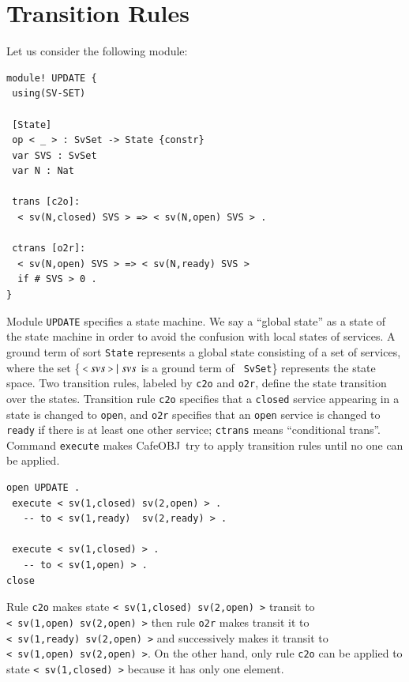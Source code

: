 \documentclass[12pt]{report}
\newcommand{\mbstt}[1]{\mbox{\small{\tt {#1}}}}
\newcommand{\stt}[1]{{\small{\tt {#1}}}}
\newcommand{\cafeobj}{{\sf CafeOBJ}~}
\begin{document}
\section{Transition Rules}
\label{sec:rules}
Let us consider the following module:
\begin{verbatim}
module! UPDATE {
 using(SV-SET)

 [State]
 op < _ > : SvSet -> State {constr}
 var SVS : SvSet    
 var N : Nat

 trans [c2o]: 
  < sv(N,closed) SVS > => < sv(N,open) SVS > .

 ctrans [o2r]: 
  < sv(N,open) SVS > => < sv(N,ready) SVS >
  if # SVS > 0 . 
}
\end{verbatim}
Module {\tt UPDATE} specifies a state machine. We say a ``global state''
as a state of the state machine in order to avoid the confusion with
local states of services. A ground term of sort {\tt State} represents
a global state consisting of a set of services, where the set
\{$\ \mbstt{<}\ svs\ \mbstt{>}\mid svs$ is a ground term of {\tt
  SvSet}\} represents the state space. Two transition rules, labeled
by {\tt c2o} and {\tt o2r}, define the state transition over the
states.  Transition rule {\tt c2o} specifies that a {\tt closed}
service appearing in a state is changed to {\tt open}, and {\tt o2r}
specifies that an {\tt open} service is changed to {\tt ready} if
there is at least one other service; {\tt ctrans} means ``conditional
trans''.  Command {\tt execute} makes \cafeobj try to apply transition
rules until no one can be applied.
\begin{verbatim}
open UPDATE .
 execute < sv(1,closed) sv(2,open) > .
   -- to < sv(1,ready)  sv(2,ready) > .

 execute < sv(1,closed) > .
   -- to < sv(1,open) > .
close
\end{verbatim}
Rule {\tt c2o} makes state \stt{<~sv(1,closed)~sv(2,open)~>} transit
to \stt{<~sv(1,open)~sv(2,open)~>} then rule {\tt o2r} makes transit
it to \stt{<~sv(1,ready)~sv(2,open)~>} and successively makes it
transit to \stt{<~sv(1,open)~sv(2,open)~>}. On the other hand,
only rule {\tt c2o} can be applied to state \stt{<~sv(1,closed)~>}
because it has only one element.

\end{document}
